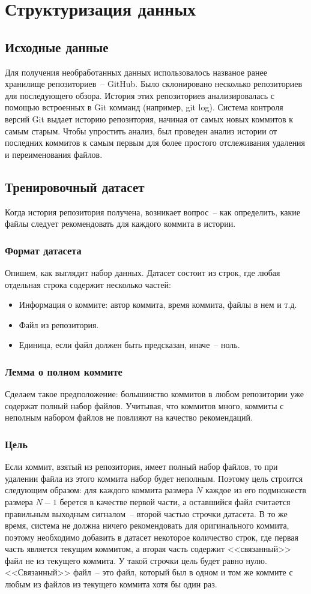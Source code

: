 \documentclass[times]{itmo-student-thesis}
\begin{document}
\section{Структуризация данных}
\subsection{Исходные данные}
Для получения необработанных данных использовалось названое ранее хранилище репозиториев~-- GitHub. Было склонировано несколько репозиториев для последующего обзора. История этих репозиториев анализировалась с помощью встроенных в Git комманд (например, git log). Система контроля версий Git выдает историю репозитория, начиная от самых новых коммитов к самым старым. Чтобы упростить анализ, был проведен анализ истории от последних коммитов к самым первым для более простого отслеживания удаления и переименования файлов.
\subsection{Тренировочный датасет}
Когда история репозитория получена, возникает вопрос~-- как определить, какие файлы следует рекомендовать для каждого коммита в истории.
\subsubsection{Формат датасета}
Опишем, как выглядит набор данных. Датасет состоит из строк, где любая отдельная строка содержит несколько частей:
    \begin{itemize}
		\item Информация о коммите: автор коммита, время коммита, файлы в нем и т.д.
		\item Файл из репозитория.
		\item Единица, если файл должен быть предсказан, иначе~-- ноль.
	\end{itemize}
\subsubsection{Лемма о полном коммите}
Сделаем такое предположение: большинство коммитов в любом репозитории уже содержат полный набор файлов. Учитывая, что коммитов много, коммиты с неполным набором файлов не повлияют на качество рекомендаций.
\subsubsection{Цель}
Если коммит, взятый из репозитория, имеет полный набор файлов, то при удалении файла из этого коммита набор будет неполным. Поэтому цель строится следующим образом: для каждого коммита размера $N$ каждое из его подмножеств размера $N - 1$ берется в качестве первой части, а оставшийся файл считается правильным выходным сигналом~-- второй частью строчки датасета. В то же время, система не должна ничего рекомендовать для оригинального коммита, поэтому необходимо добавить в датасет некоторое количество строк, где первая часть является текущим коммитом, а вторая часть содержит <<связанный>> файл не из текущего коммита. У такой строчки цель будет равно нулю. <<Связанный>> файл~-- это файл, который был в одном и том же коммите с любым из файлов из текущего коммита хотя бы один раз.
\end{document}
